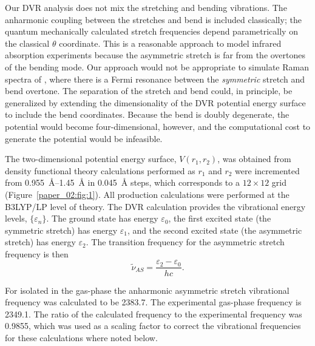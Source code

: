 Our DVR analysis does not mix the stretching and bending vibrations. The anharmonic coupling between the stretches and bend is included classically; the quantum mechanically calculated stretch frequencies depend parametrically on the classical \(\theta\) coordinate. This is a reasonable approach to model infrared absorption experiments because the asymmetric stretch is far from the overtones of the bending mode. Our approach would not be appropriate to simulate Raman spectra of , where there is a Fermi resonance between the \emph{symmetric} stretch and bend overtone. The separation of the stretch and bend could, in principle, be generalized by extending the dimensionality of the DVR potential energy surface to include the bend coordinates. Because the bend is doubly degenerate, the potential would become four-dimensional, however, and the computational cost to generate the potential would be infeasible.

The two-dimensional potential energy surface, \(V\left(r_1,r_2\right)\), was obtained from density functional theory calculations performed as \(r_1\) and \(r_2\) were incremented from \SIrange{0.955}{1.45}{\angstrom} in \SI{0.045}{\angstrom} steps, which corresponds to a \(12 \times 12\) grid (Figure~\ref{paper_02:fig:1}). All production calculations were performed at the B3LYP/LP level of theory. The DVR calculation provides the vibrational energy levels, \(\{\varepsilon_{n}\}\). The ground state has energy \(\varepsilon_{0}\), the first excited state (the symmetric stretch) has energy \(\varepsilon_{1}\), and the second excited state (the asymmetric stretch) has energy \(\varepsilon_{2}\). The transition frequency for the asymmetric stretch frequency is then
\begin{equation}
  \label{paper_02:eq:2}
  \widetilde{\nu}_{AS} = \frac{\varepsilon_{2} - \varepsilon_{0}}{hc}.
\end{equation}

For  isolated in the gas-phase the anharmonic asymmetric stretch vibrational frequency was calculated to be \SI{2383.7}{\wavenumber}. The experimental gas-phase frequency is \SI{2349.1}{\wavenumber}. The ratio of the calculated frequency to the experimental frequency was \num{0.9855}, which was used as a scaling factor to correct the vibrational frequencies for these calculations where noted below.

